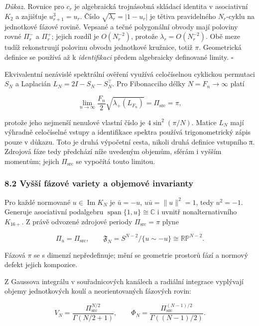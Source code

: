 \documentclass[
  10pt,
]{article}
\begin{document}
\emph{Důkaz.} Rovnice pro \(c_r\) je algebraická trojnásobná skládací
identita v asociativní \(K_2\) a zajišťuje \(u_{r+1}^3=u_r\). Číslo
\(\sqrt{\lambda_r}=|1-u_r|\) je tětiva pravidelného \(N_r\)-cyklu na
jednotkové fázové rovině. Vepsané a tečné polygonální obvody mají
poloviny rovné \(\Pi_r^-\) a \(\Pi_r^+\); jejich rozdíl je
\(O(N_r^{-2})\), protože \(\lambda_r=O(N_r^{-2})\). Obě meze tudíž
rekonstruují polovinu obvodu jednotkové kružnice, totiž \(\pi\).
Geometrická definice se používá až k \emph{identifikaci} předem
algebraicky definované limity. \(\square\)

Ekvivalentní nezávislé spektrální ověření využívá celočíselnou cyklickou
permutaci \(S_N\) a Laplacián \(L_N=2I-S_N-S_N^\top\). Pro Fibonacciho
délky \(N=F_n\to\infty\) platí

\[
\boxed{\lim_{n\to\infty}\frac{F_n}{2}\sqrt{\lambda_+(L_{F_n})}=\Pi_{\mathrm{src}}=\pi},\tag{15c}
\]

protože jeho nejmenší nenulové vlastní číslo je \(4\sin^2(\pi/N)\).
Matice \(L_N\) mají výhradně celočíselné vstupy a identifikace spektra
používá trigonometrický zápis pouze v důkazu. Toto je druhá výpočetní
cesta, nikoli druhá definice vstupního π. Zdrojová fáze tedy předchází
níže uvedeným objemům, sférám i vyšším momentům; jejich
\(\Pi_{\mathrm{src}}\) se vypočítá touto limitou.

\subsubsection{8.2 Vyšší fázové variety a objemové
invarianty}\label{vyux161ux161uxed-fuxe1zovuxe9-variety-a-objemovuxe9-invarianty}

Pro každé normované \(u\in\operatorname{Im}K_N\) je \(\bar u=-u\),
\(u\bar u=\|u\|^2=1\), tedy \(u^2=-1\). Generuje asociativní podalgebru
\(\operatorname{span}\{1,u\}\cong\mathbb C\) i uvnitř nonalternativního
\(K_{16+}\). Z právě odvozené zdrojové periody
\(\Pi_{\mathrm{src}}=\pi\) plyne

\[
\Pi_u=\Pi_{\mathrm{src}},\qquad\mathfrak F_N=S^{N-2}/\{u\sim-u\}\cong\mathbb{RP}^{N-2}.
\tag{15}
\]

Fázová \(\pi\) se s dimenzí nepředefinuje; mění se geometrie prostorů
fází a normový defekt jejich kompozice.

Z Gaussova integrálu v souřadnicových kanálech a radiální integrace
vyplývají objemy jednotkových koulí a neorientovaných fázových rovin:

\[
V_N=\frac{\Pi_{\mathrm{src}}^{N/2}}{\Gamma(N/2+1)},\qquad
\Phi_N=\frac{\Pi_{\mathrm{src}}^{(N-1)/2}}{\Gamma((N-1)/2)}.
\tag{16}
\]
\end{document}
